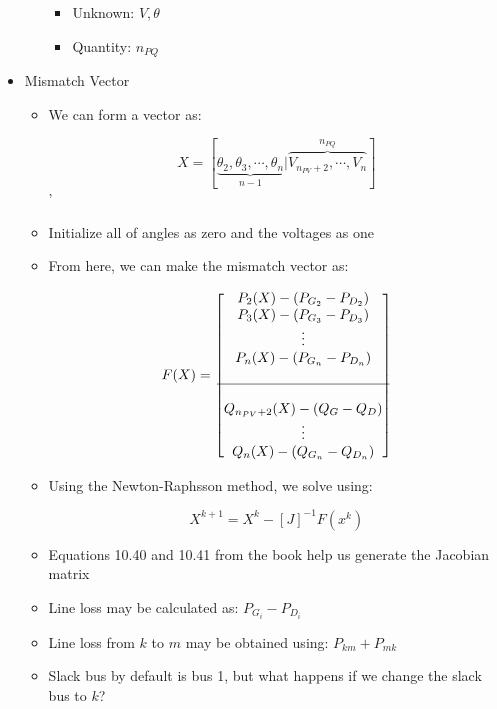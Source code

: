 \begin{itemize}
\begin{itemize}
\begin{itemize}
            \item Unknown: $V,\theta$

            \item Quantity: $n_{PQ}$

          \end{itemize}

      \end{itemize}

    \item Mismatch Vector

      \begin{itemize}

        \item We can form a vector as:

          $$X=[\underbrace{\theta_2,\theta_3,\cdots,\theta_n}_{n-1}|\overbrace{V_{n_{PV}+2},\cdots,V_n}^{n_{PQ}}]$$
          '
        \item Initialize all of angles as zero and the voltages as one

        \item From here, we can make the mismatch vector as:

          $$F(X)=\left[ \begin{matrix} P_2(X)-(P_{G_2}-P_{D_2})\\P_3(X)-(P_{G_3}-P_{D_3})\\\vdots\\P_n(X)-(P_{G_n}-P_{D_n})\\\\\hline\\ Q_{n_{PV}+2}(X)-(Q_G-Q_D)\\\vdots\\ Q_n(X)-(Q_{G_n}-Q_{D_n}) \end{matrix}\right]$$

        \item Using the Newton-Raphsson method, we solve using:

          $$X^{k+1}=X^k-[J]^{-1}F(x^k)$$

        \item Equations 10.40 and 10.41 from the book help us generate the Jacobian matrix

        \item Line loss may be calculated as: $P_{G_i}-P_{D_i}$

        \item Line loss from $k$ to $m$ may be obtained using: $P_{km}+P_{mk}$

        \item Slack bus by default is bus 1, but what happens if we change the slack bus to $k$?


\end{itemize}
\end{itemize}
